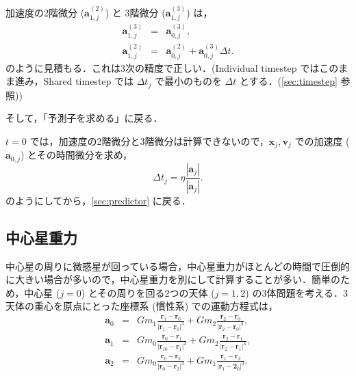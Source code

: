 \documentclass[11pt,a4paper,oneside,onecolumn]{jreport}
\begin{document}
加速度の2階微分 (${\bm a}_{1,j}^{(2)}$) と 3階微分 (${\bm a}_{1,j}^{(3)}$) は，
\begin{eqnarray}
{\bm a}_{1,j}^{(3)} & = & {\bm a}_{0,j}^{(3)}, \\
{\bm a}_{1,j}^{(2)} & = & {\bm a}_{0,j}^{(2)} + {\bm a}_{0,j}^{(3)} \Delta t. 
\end{eqnarray}
のように見積もる．これは3次の精度で正しい．(Individual timestep ではこのまま進み，Shared timestep では $\Delta t_j$ で最小のものを $\Delta t$ とする．(\ref{sec:timestep} 参照))

そして，「予測子を求める」に戻る．

$t = 0$ では，加速度の2階微分と3階微分は計算できないので，${\bm x}_j,{\bm v}_j$ での加速度 (${\bm a}_{0,j}$) とその時間微分を求め，
\begin{equation}
\Delta t_j = \eta \frac{|{\bm a}_j|}{|\dot{{\bm a}}_j|}.
\end{equation}
のようにしてから，\ref{sec:predictor} に戻る．

\subsection{中心星重力}
中心星の周りに微惑星が回っている場合，中心星重力がほとんどの時間で圧倒的に大きい場合が多いので，中心星重力を別にして計算することが多い．簡単のため，中心星 ($j = 0$) とその周りを回る2つの天体 ($j = 1, 2$) の3体問題を考える．3天体の重心を原点にとった座標系 (慣性系) での運動方程式は，
\begin{eqnarray}
{\bm a}_0 & = & G m_1 \frac{{\bm r}_1 - {\bm r}_0}{|{\bm r}_1 - {\bm r}_0|^3} + G m_2  \frac{{\bm r}_2 - {\bm r}_0}{|{\bm r}_2 - {\bm r}_0|^3}, \label{eq:a0}\\
{\bm a}_1 & = & G m_0 \frac{{\bm r}_0 - {\bm r}_1}{|{\bm r}_10- {\bm r}_1|^3} + G m_2  \frac{{\bm r}_2 - {\bm r}_1}{|{\bm r}_2 - {\bm r}_1|^3}, \label{eq:a1}\\
{\bm a}_2 & = & G m_0 \frac{{\bm r}_0 - {\bm r}_2}{|{\bm r}_0 - {\bm r}_2|^3} + G m_1  \frac{{\bm r}_1 - {\bm r}_2}{|{\bm r}_1 - {\bm 2}_0|^3}. \label{eq:a2}
\end{eqnarray}
\end{document}
